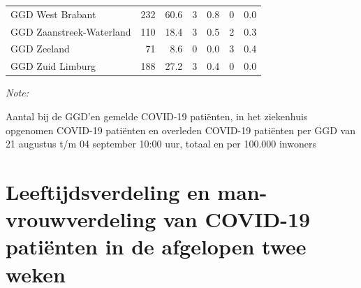 \documentclass[
  english,
  man,floatsintext]{apa6}
\begin{document}
\begin{table}[H]
\begin{threeparttable}
\begin{tabular}{lrrrrrr}
GGD West Brabant & 232 & 60.6 & 3 & 0.8 & 0 & 0.0\\
GGD Zaanstreek-Waterland & 110 & 18.4 & 3 & 0.5 & 2 & 0.3\\
GGD Zeeland & 71 & 8.6 & 0 & 0.0 & 3 & 0.4\\
GGD Zuid Limburg & 188 & 27.2 & 3 & 0.4 & 0 & 0.0\\
\bottomrule
\end{tabular}
\begin{tablenotes}
\item \textit{Note: } 
\item Aantal bij de GGD’en gemelde COVID-19 patiënten, in het ziekenhuis opgenomen COVID-19 patiënten en overleden COVID-19 patiënten per GGD van 21 augustus t/m 04 september 10:00 uur, totaal en per 100.000 inwoners
\end{tablenotes}
\end{threeparttable}
\endgroup{}
\end{table}

\newpage

\hypertarget{leeftijdsverdeling-en-man-vrouwverdeling-van-covid-19-patiuxebnten-in-de-afgelopen-twee-weken}{%
\section{Leeftijdsverdeling en man-vrouwverdeling van COVID-19 patiënten in de afgelopen twee weken}\label{leeftijdsverdeling-en-man-vrouwverdeling-van-covid-19-patiuxebnten-in-de-afgelopen-twee-weken}}
\end{document}
